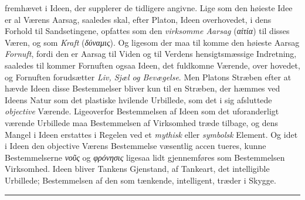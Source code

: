 \documentclass[12pt,a4paper]{book}
\newcommand{\divrule}{\begin{center}\rule{2cm}{0.4pt}\end{center}}
\newcommand{\gk}[1]{\textit{#1}}
\begin{document}
fremhævet i Ideen, der supplerer de tidligere angivne. Lige\-%
som den høieste Idee er al Værens Aarsag, saaledes skal, efter
Platon, Ideen overhovedet, i dens Forhold til Sandsetingene,
opfattes som den \emph{virksomme Aarsag} (\gk{αἰτία}) til disses
Væren, og som \emph{Kraft} (\gk{δύναμις}). Og ligesom der maa til\-%
komme den høieste Aarsag \emph{Fornuft}, fordi den er Aarsag til
Viden og til Verdens hensigtsmæssige Indretning, saaledes til\-%
kommer Fornuften ogsaa Ideen, det fuldkomne Værende, over\-%
hovedet, og Fornuften forudsætter \emph{Liv, Sjæl og Bevægelse}.
Men Platons Stræben efter at hævde Ideen disse Bestemmelser
bliver kun til en Stræben, der hæmmes ved Ideens Natur som
det plastiske hvilende Urbillede, som det i sig afsluttede
\emph{objective} Værende. Ligeoverfor Bestemmelsen af Ideen som
det uforanderligt værende Urbillede maa Bestemmelsen af
Virksomhed træde tilbage, og dens Mangel i Ideen erstattes i
Regelen ved et \emph{mythisk} eller \emph{symbolsk} Element. Og idet
i Ideen den objective Værens Bestemmelse væsentlig accen\-%
tueres, kunne Bestemmelserne \gk{νοῦς} og \gk{φρόνησις} ligesaa lidt
gjennemføres som Bestemmelsen Virksomhed. Ideen bliver
Tankens Gjenstand, af Tankeart, det intelligible Urbillede;
Bestemmelsen af den som tænkende, intelligent, træder i Skygge.

\divrule
\end{document}

